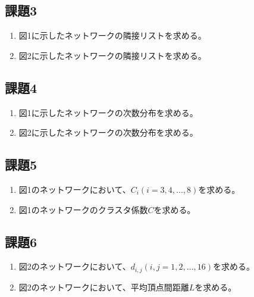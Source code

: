 \documentclass[12pt]{jarticle}
\begin{document}
\subsection{課題3}
\begin{enumerate}
    \item 図1に示したネットワークの隣接リストを求める。
    \item 図2に示したネットワークの隣接リストを求める。
\end{enumerate}

\subsection{課題4}
\begin{enumerate}
    \item 図1に示したネットワークの次数分布を求める。
    \item 図2に示したネットワークの次数分布を求める。
\end{enumerate}

\subsection{課題5}
\begin{enumerate}
    \item 図1のネットワークにおいて、$C_i(i=3,4,...,8)$を求める。
    \item 図1のネットワークのクラスタ係数$C$を求める。
\end{enumerate}

\subsection{課題6}
\begin{enumerate}
    \item 図2のネットワークにおいて、$d_{i,j}(i,j=1,2,...,16)$を求める。
    \item 図2のネットワークにおいて、平均頂点間距離$L$を求める。
\end{enumerate}

\clearpage
\end{document}
